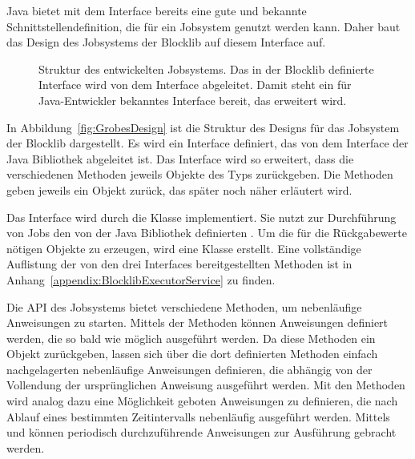 Java bietet mit dem Interface  bereits eine gute und bekannte Schnittstellendefinition, die für ein Jobsystem genutzt werden kann. Daher baut das Design des Jobsystems der Blocklib auf diesem Interface auf. 

\begin{figure}
	
	\caption[Struktur des entwickelten Jobsystems.]{Struktur des entwickelten Jobsystems. Das in der Blocklib definierte Interface wird von dem Interface  abgeleitet. Damit steht ein für Java-Entwickler bekanntes Interface bereit, das erweitert wird.}\label{fig:GrobesDesign}
\end{figure}

In Abbildung~\vref{fig:GrobesDesign} ist die Struktur des Designs für das Jobsystem der Blocklib dargestellt. Es wird ein Interface  definiert, das von dem Interface  der Java Bibliothek abgeleitet ist. Das Interface wird so erweitert, dass die verschiedenen  Methoden jeweils Objekte des Typs  zurückgeben. Die  Methoden geben jeweils ein  Objekt zurück, das später noch näher erläutert wird.

Das Interface  wird durch die Klasse  implementiert. Sie nutzt zur Durchführung von Jobs den von der Java Bibliothek definierten . Um die für die Rückgabewerte nötigen  Objekte zu erzeugen, wird eine Klasse  erstellt. Eine vollständige Auflistung der von den drei Interfaces bereitgestellten Methoden ist in Anhang~\vref{appendix:BlocklibExecutorService} zu finden. 

Die API des Jobsystems bietet verschiedene Methoden, um nebenläufige Anweisungen zu starten. Mittels der  Methoden können Anweisungen definiert werden, die so bald wie möglich ausgeführt werden. Da diese Methoden ein  Objekt zurückgeben, lassen sich über die dort definierten Methoden einfach nachgelagerten nebenläufige Anweisungen definieren, die abhängig von der Vollendung der ursprünglichen Anweisung ausgeführt werden. Mit den  Methoden wird analog dazu eine Möglichkeit geboten Anweisungen zu definieren, die nach Ablauf eines bestimmten Zeitintervalls nebenläufig ausgeführt werden. Mittels  und  können periodisch durchzuführende Anweisungen zur Ausführung gebracht werden.